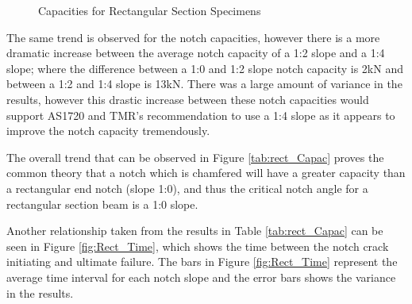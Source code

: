 \documentclass[11pt,a4paper]{article}
\numberwithin{equation}{subsection}
\begin{document}
\vspace*{\baselineskip}

\begin{figure}[h]
	\begin{center}
	\end{center}
	\caption{Capacities for Rectangular Section Specimens}
	\label{fig:Rect_Spec_Cap}
\end{figure}

\noindent
The same trend is observed for the notch capacities, however there is a more dramatic increase between the average notch capacity of a 1:2 slope and a 1:4 slope; where the difference between a 1:0 and 1:2 slope notch capacity is 2kN and between a 1:2 and 1:4 slope is 13kN. There was a large amount of variance in the results, however this drastic increase between these notch capacities would support AS1720 and TMR's recommendation to use a 1:4 slope as it appears to improve the notch capacity tremendously. 

\vspace*{\baselineskip}

\noindent
The overall trend that can be observed in Figure \ref{tab:rect_Capac} proves the common theory that a notch which is chamfered will have a greater capacity than a rectangular end notch (slope 1:0), and thus the critical notch angle for a rectangular section beam is a 1:0 slope.

\vspace*{\baselineskip}

\noindent
Another relationship taken from the results in Table \ref{tab:rect_Capac} can be seen in Figure \ref{fig:Rect_Time}, which shows the time between the notch crack initiating and ultimate failure. The bars in Figure \ref{fig:Rect_Time} represent the average time interval for each notch slope and the error bars shows the variance in the results.  
\end{document}
